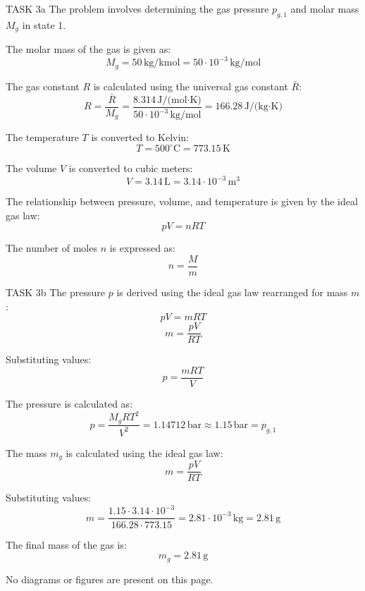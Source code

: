 TASK 3a  
The problem involves determining the gas pressure \( p_{g,1} \) and molar mass \( M_g \) in state 1.  

The molar mass of the gas is given as:  
\[
M_g = 50 \, \text{kg/kmol} = 50 \cdot 10^{-3} \, \text{kg/mol}
\]  

The gas constant \( R \) is calculated using the universal gas constant \( \bar{R} \):  
\[
R = \frac{\bar{R}}{M_g} = \frac{8.314 \, \text{J/(mol·K)}}{50 \cdot 10^{-3} \, \text{kg/mol}} = 166.28 \, \text{J/(kg·K)}
\]  

The temperature \( T \) is converted to Kelvin:  
\[
T = 500^\circ\text{C} = 773.15 \, \text{K}
\]  

The volume \( V \) is converted to cubic meters:  
\[
V = 3.14 \, \text{L} = 3.14 \cdot 10^{-3} \, \text{m}^3
\]  

The relationship between pressure, volume, and temperature is given by the ideal gas law:  
\[
pV = nRT
\]  

The number of moles \( n \) is expressed as:  
\[
n = \frac{M}{m}
\]  

TASK 3b  
The pressure \( p \) is derived using the ideal gas law rearranged for mass \( m \):  
\[
pV = mR T
\]  
\[
m = \frac{pV}{RT}
\]  

Substituting values:  
\[
p = \frac{mR T}{V}
\]  

The pressure is calculated as:  
\[
p = \frac{M_g R T^2}{V^2} = 1.14712 \, \text{bar} \approx 1.15 \, \text{bar} = p_{g,1}
\]  

The mass \( m_g \) is calculated using the ideal gas law:  
\[
m = \frac{pV}{RT}
\]  

Substituting values:  
\[
m = \frac{1.15 \cdot 3.14 \cdot 10^{-3}}{166.28 \cdot 773.15} = 2.81 \cdot 10^{-3} \, \text{kg} = 2.81 \, \text{g}
\]  

The final mass of the gas is:  
\[
m_g = 2.81 \, \text{g}
\]  

No diagrams or figures are present on this page.